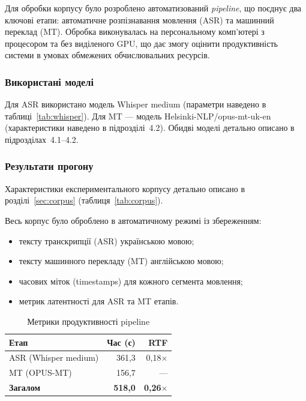 Для обробки корпусу було розроблено автоматизований \textit{pipeline}, що
поєднує два ключові етапи: автоматичне розпізнавання мовлення (ASR) та
машинний переклад (MT). Обробка виконувалась на персональному комп'ютері
з процесором та без виділеного GPU, що дає змогу оцінити продуктивність
системи в умовах обмежених обчислювальних ресурсів.

\subsubsection{Використані моделі}

Для ASR використано модель Whisper medium (параметри наведено в
таблиці~\ref{tab:whisper}). Для MT --- модель
Helsinki-NLP/opus-mt-uk-en (характеристики наведено в
підрозділі~4.2). Обидві моделі детально описано
в підрозділах~4.1--4.2.

\subsubsection{Результати прогону}

Характеристики експериментального корпусу детально описано в розділі~\ref{sec:corpus}
(таблиця~\ref{tab:corpus}).

Весь корпус було оброблено в автоматичному режимі із збереженням:
\begin{itemize}
    \item тексту транскрипції (ASR) українською мовою;
    \item тексту машинного перекладу (MT) англійською мовою;
    \item часових міток (timestamps) для кожного сегмента мовлення;
    \item метрик латентності для ASR та MT етапів.
\end{itemize}

\begin{table}[h]
\centering
\caption{Метрики продуктивності pipeline}
\label{tab:latency}
\begin{tabular}{|l|r|r|}
\hline
\textbf{Етап} & \textbf{Час (с)} & \textbf{RTF} \\
\hline
ASR (Whisper medium) & 361,3 & 0,18$\times$ \\
MT (OPUS-MT) & 156,7 & --- \\
\hline
\textbf{Загалом} & \textbf{518,0} & \textbf{0,26$\times$} \\
\hline
\end{tabular}
\end{table}

